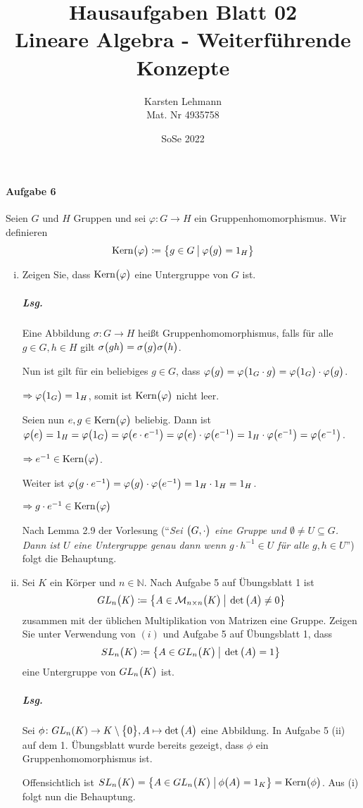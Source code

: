 \documentclass{scrreprt}
\author{Karsten Lehmann\\Mat. Nr 4935758}
\date{SoSe 2022}
\title{Hausaufgaben Blatt 02\\Lineare Algebra - Weiterführende Konzepte}
\newcommand{\Kern}{\text{Kern}}
\begin{document}
\paragraph{Aufgabe 6} Seien $G$ und $H$ Gruppen und sei $\varphi \colon G \to H$
ein Gruppenhomomorphismus.
Wir definieren
\[
  \Kern\qty\big(\varphi) \coloneqq
  \qty{ g \in G \:{\big |}\: \varphi\qty\big(g) = 1_H}
\]
\begin{enumerate}[(i)]
\item Zeigen Sie, dass $\Kern\qty\big(\varphi)$ eine Untergruppe von $G$ ist.

  \subparagraph{Lsg.} Eine Abbildung $\sigma \colon G \to H$ heißt
  Gruppenhomomorphismus, falls für alle $g \in G, h \in H$ gilt
  $\sigma\qty\big(gh) = \sigma\qty\big(g)\sigma\qty\big(h)$.

  Nun ist gilt für ein beliebiges $g \in G$, dass
  $\varphi\qty\big(g) = \varphi\qty\big(1_G \cdot g)
  = \varphi\qty\big(1_G) \cdot \varphi\qty\big(g)$.

  $\Rightarrow \varphi\qty\big(1_G) = 1_H$, somit ist $\Kern\qty\big(\varphi)$
  nicht leer.

  Seien nun $e, g \in \Kern\qty\big(\varphi)$ beliebig.
  Dann ist $\varphi\qty\big(e) = 1_H = \varphi\qty\big(1_G)
  = \varphi\qty\big(e \cdot e^{-1})
  = \varphi\qty\big(e) \cdot \varphi\qty\big(e^{-1})
  = 1_H \cdot \varphi\qty\big(e^{-1}) = \varphi\qty\big(e^{-1})$.

  $\Rightarrow e^{-1} \in \Kern\qty\big(\varphi)$.

  Weiter ist $\varphi\qty\big(g \cdot e^{-1})
  = \varphi\qty\big(g) \cdot \varphi\qty\big(e^{-1}) = 1_H \cdot 1_H = 1_H$.

  $\Rightarrow g \cdot e^{-1} \in \Kern\qty\big(\varphi)$

  Nach Lemma 2.9 der Vorlesung (``\emph{Sei $\qty\big(G, \cdot)$ eine Gruppe
    und $\emptyset \ne U \subseteq G$.
    Dann ist $U$ eine Untergruppe genau dann wenn $g \cdot h^{-1} \in U$
    für alle $g, h \in U$}'') folgt die Behauptung.

\item Sei $K$ ein Körper und $n \in \mathbb{N}$.
  Nach Aufgabe 5 auf Übungsblatt 1 ist
  \[
    GL_n\qty\big(K) \coloneqq \qty{
      A \in \mathcal{M}_{n \times n}\qty\big(K)
      \:{\big |}\:
      \det\qty\big(A) \ne 0
    }
  \]
  zusammen mit der üblichen Multiplikation von Matrizen eine Gruppe.
  Zeigen Sie unter Verwendung von $(i)$ und Aufgabe 5 auf Übungsblatt 1, dass
  \[
    SL_n\qty\big(K) \coloneqq \qty{
      A \in GL_n\qty\big(K)
      \:{\big |}\:
      \det\qty\big(A) = 1
    }
  \]
  eine Untergruppe von $GL_n\qty\big(K)$ ist.

  \subparagraph{Lsg.} Sei $\phi \colon  GL_n(K) \to K \setminus \qty\big{0},
  A \mapsto \det\qty\big(A)$ eine Abbildung.
  In Aufgabe 5 (ii) auf dem 1. Übungsblatt wurde bereits gezeigt, dass
  $\phi$ ein Gruppenhomomorphismus ist.

  Offensichtlich ist $SL_n\qty\big(K) = \qty{
      A \in GL_n\qty\big(K)
      \:{\big |}\:
      \phi\qty\big(A) = 1_K
    } = \Kern\qty\big(\phi)$.
    Aus (i) folgt nun die Behauptung.
\end{enumerate}
\end{document}
